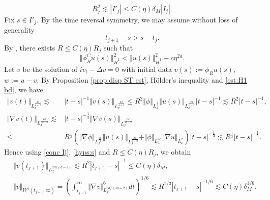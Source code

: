 \documentclass[reqno, 11pt]{amsart}
\numberwithin{equation}{section}
\theoremstyle{plain}
\theoremstyle{definition}
\numberwithin{equation}{section}
\numberwithin{theorem}{section}
\numberwithin{equation}{section}
\numberwithin{equation}{section}
\numberwithin{theorem}{section}
\begin{document}
	\begin{equation}\label{conc Ij}
	R_j^2\lesssim |I'_{j}|\leq C(\eta)\delta_{M}|I_j|.
	\end{equation}
	Fix $s\in I'_{j}$. By the time reversal symmetry, we may assume without loss of generality
	\begin{equation}\label{hyps:s}
	t_{j+1}-s >s-t_j.
	\end{equation}
	By \cite{Bourg,MXZ:crit Hart:def rad}, there exists $R\leq C(\eta)R_j$ such that 
	\begin{equation}\label{est:H1 w}
	\Vert \phi_R^C u(s) \Vert_{\dot{H}^1}^2 < \Vert  u(s) \Vert_{\dot{H}^1}^2-c\eta^{2a}.
	\end{equation}
	Let $v$ be the solution of $iv_t-\Delta v=0$ with initial data $v(s):=\phi_{R}u(s)$, $w:=u-v$. By Proposition \ref{prop:disp ST est}, Hölder's inequality and \eqref{est:H1 bd}, we have
	\begin{equation}\label{est:disp v1}
	\begin{aligned}
	\Vert v(t) \Vert_{L_x^{\frac{2d}{d-2}}} \lesssim& |t-s|^{-1} \Vert v(s)\Vert_{L_x^{\frac{2d}{d+2}}}\leq R^{2}\Vert\phi\Vert_{L_x^{\frac{d}{2}}}\Vert u(s)\Vert_{L_x^{\frac{2d}{d-2}}}|t-s|^{-1}  \lesssim R^{2}|t-s|^{-1},\\ \Vert \nabla v(t) \Vert_{L_x^{\frac{6d}{3d-2}}} \lesssim& |t-s|^{-\frac13} \Vert \nabla v(s) \Vert_{L_x^{\frac{6d}{3d+2}}}\\\leq& R^{\frac13}\left(\Vert\nabla\phi\Vert_{L_x^{\frac{3d}{4}}}\Vert u(s)\Vert_{L_x^{\frac{2d}{d-2}}}+\Vert\phi\Vert_{L_x^{3d}}\Vert\nabla u\Vert_{L_x^2}  \right)|t-s|^{-\frac13} \lesssim R^{\frac13} |t-s|^{-\frac13}.
	\end{aligned}
	\end{equation}
	Hence using \eqref{conc Ij}, \eqref{hyps:s} and $R\leq C(\eta)R_j$, we obtain 
	\begin{equation}\label{vdec}
	\begin{aligned}
	&\Vert v(t_{j+1}) \Vert_{L_x^{2d/(d-2)}} \lesssim R^{2}|t_{j+1}-s|^{-1}\leq C(\eta)\delta_{M},\\ &\Vert v \Vert_{W^1(t_{j+1},\infty)}=\left(\int_{t_{j+1}}^{\infty}\Vert \nabla v\Vert_{L_x^{6d/(3d-2)}}^6 dt \right)^{1/6} \lesssim R^{1/3}|t_{j+1}-s|^{-1/6} \lesssim C(\eta)\delta_{M}^{1/6}.
	\end{aligned}
	\end{equation}
	
\end{document}
